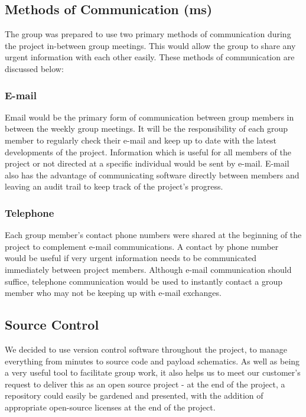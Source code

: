 \subsection{Methods of Communication (ms)}

The group was prepared to use two primary methods of communication during the project
in-between group meetings. This would allow the group to share any urgent information
with each other easily.
These methods of communication are discussed below:

\subsubsection{E-mail}

Email would be the primary form of communication between group members
in between the weekly group meetings. It will be the responsibility of each group
member to regularly check their e-mail and keep up to date with the latest 
developments of the project. Information which is useful for all members of the 
project or not directed at a specific individual would be sent by e-mail. E-mail also 
has the advantage of communicating software directly between members and leaving
an audit trail to keep track of the project's progress.

\subsubsection{Telephone}

Each group member's contact phone numbers were shared at the beginning of the
project to complement e-mail communications. A contact by phone number would
be useful if very urgent information needs to be communicated immediately between
project members. Although e-mail communication should suffice, telephone 
communication would be used to instantly contact a group member who may not
be keeping up with e-mail exchanges.

\subsection{Source Control}
\label{source control}
We decided to use version control software throughout the project, to manage 
everything from minutes to source code and payload schematics. As well as 
being a very useful tool to facilitate group work, it also helps us to meet 
our customer's request to deliver this as an open source project - at the end 
of the project, a repository could easily be gardened and presented, with the 
addition of appropriate open-source licenses at the end of the project.

